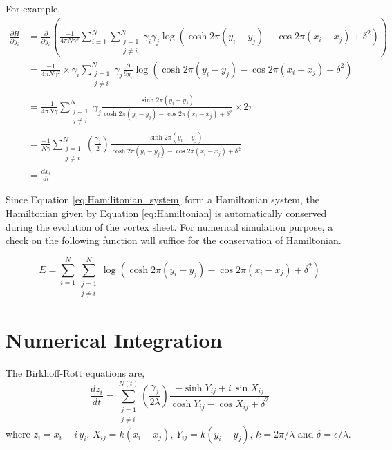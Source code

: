 \documentclass{article}
\begin{document}
For example,
\begin{align*}
\frac{\partial H}{\partial y_i} &= \frac{\partial}{\partial y_i}\left(\frac{-1}{4\pi N \gamma^2}\sum_{i=1}^N\sum_{\substack{j=1 \\ j\neq i}}^{N}\gamma_i \gamma_j \log \left( \cosh {2\pi(y_i-y_j)} -\cos {2\pi(x_i-x_j)} +\delta^2\right) \right) \\
&= \frac{-1}{4\pi N \gamma^2} \times \gamma_i \sum_{\substack{j=1 \\ j\neq i}}^{N}\gamma_j\frac{\partial}{\partial y_i}\log \left( \cosh {2\pi(y_i-y_j)} -\cos {2\pi(x_i-x_j)} +\delta^2\right) \\
&= \frac{-1}{4\pi N \gamma} \sum_{\substack{j=1 \\ j\neq i}}^{N}\gamma_j\frac{\sinh 2\pi(y_i-y_j)}{\cosh 2\pi(y_i-y_j)-\cos 2\pi(x_i-x_j)+\delta^2} \times {2\pi} \\
&=  \frac{-1}{N \gamma}\sum_{\substack{j=1 \\ j\neq i}}^{N}\left(\frac{\gamma_j}{2}\right)\frac{\sinh 2\pi(y_i-y_j)}{\cosh 2\pi(y_i-y_j)-\cos 2\pi(x_i-x_j)+\delta^2} \\
&= \frac{dx_i}{dt}
\end{align*}


Since Equation \eqref{eq:Hamilitonian_system} form a Hamiltonian system, the Hamiltonian given by Equation \eqref{eq:Hamiltonian} is automatically conserved during the evolution of the vortex sheet. For numerical simulation purpose, a check on the following function will suffice for the conservation of Hamiltonian.

\begin{equation}
E=\sum_{i=1}^N\sum_{\substack{j=1 \\ j\neq i}}^{N}\log \left( \cosh {2\pi(y_i-y_j)} -\cos {2\pi(x_i-x_j)} +\delta^2\right)
\end{equation}


\section{Numerical Integration}

The Birkhoff-Rott equations are,
\begin{equation*}
\frac{dz_i}{dt}=\sum\limits_{\substack{j=1 \\ j\neq i}}^{N(t)}\left(\frac{\gamma_j}{2\lambda}\right)
\frac{-\sinh{Y_{ij}}+i\, \sin{X_{ij}}}{\cosh{Y_{ij}}-\cos{X_{ij}}+\delta ^2}
\end{equation*}
where $z_i=x_i+i\,y_i, \, X_{ij}=k(x_i-x_j), \, Y_{ij}=k(y_i-y_j), \, k=2\pi/\lambda$ and $\delta = \epsilon / \lambda$.
\end{document}
